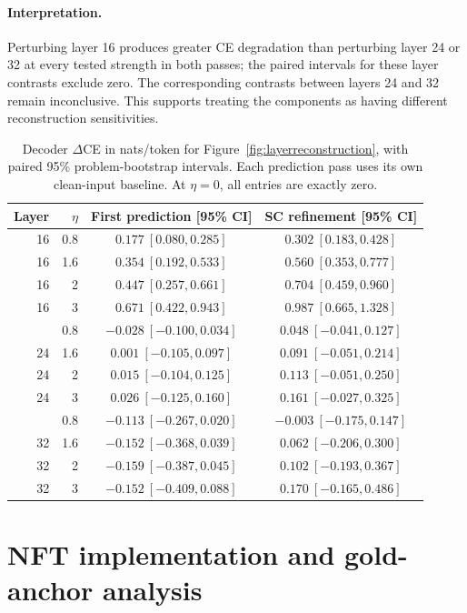 \documentclass[11pt,letterpaper]{article}
\begin{document}
\paragraph{Interpretation.}
Perturbing layer 16 produces greater CE degradation than perturbing layer 24 or 32 at every tested strength in both passes; the paired intervals for these layer contrasts exclude zero. The corresponding contrasts between layers 24 and 32 remain inconclusive. This supports treating the components as having different reconstruction sensitivities.

\begin{table}[htbp]
\centering\small
\setlength{\tabcolsep}{6pt}
\caption{Decoder $\Delta$CE in nats/token for Figure~\ref{fig:layerreconstruction}, with paired 95\% problem-bootstrap intervals. Each prediction pass uses its own clean-input baseline. At $\eta=0$, all entries are exactly zero.}
\label{tab:reconstructioncurvevalues}
\begin{tabular}{@{}rrcc@{}}
\toprule
Layer & $\eta$ & First prediction [95\% CI] & SC refinement [95\% CI] \\
\midrule
16 & 0.8 & $0.177\ [0.080, 0.285]$ & $0.302\ [0.183, 0.428]$ \\
16 & 1.6 & $0.354\ [0.192, 0.533]$ & $0.560\ [0.353, 0.777]$ \\
16 & 2 & $0.447\ [0.257, 0.661]$ & $0.704\ [0.459, 0.960]$ \\
16 & 3 & $0.671\ [0.422, 0.943]$ & $0.987\ [0.665, 1.328]$ \\
\addlinespace
24 & 0.8 & $-0.028\ [-0.100, 0.034]$ & $0.048\ [-0.041, 0.127]$ \\
24 & 1.6 & $0.001\ [-0.105, 0.097]$ & $0.091\ [-0.051, 0.214]$ \\
24 & 2 & $0.015\ [-0.104, 0.125]$ & $0.113\ [-0.051, 0.250]$ \\
24 & 3 & $0.026\ [-0.125, 0.160]$ & $0.161\ [-0.027, 0.325]$ \\
\addlinespace
32 & 0.8 & $-0.113\ [-0.267, 0.020]$ & $-0.003\ [-0.175, 0.147]$ \\
32 & 1.6 & $-0.152\ [-0.368, 0.039]$ & $0.062\ [-0.206, 0.300]$ \\
32 & 2 & $-0.159\ [-0.387, 0.045]$ & $0.102\ [-0.193, 0.367]$ \\
32 & 3 & $-0.152\ [-0.409, 0.088]$ & $0.170\ [-0.165, 0.486]$ \\
\bottomrule
\end{tabular}
\end{table}

\section{NFT implementation and gold-anchor analysis}
\label{app:nftdetails}
\end{document}
